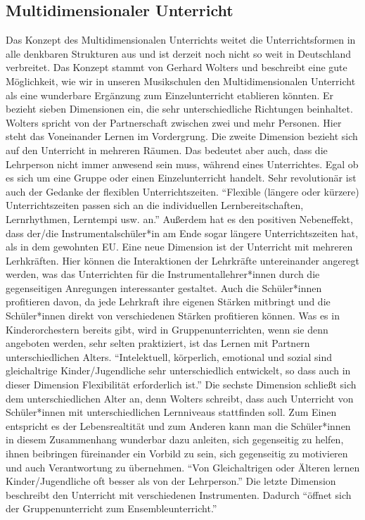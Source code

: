 \subsection{Multidimensionaler Unterricht} 
Das Konzept des Multidimensionalen Unterrichts weitet die Unterrichtsformen in
alle denkbaren Strukturen aus und ist derzeit noch nicht so weit in Deutschland
verbreitet. Das Konzept stammt von Gerhard Wolters und beschreibt eine gute
Möglichkeit, wie wir in unseren Musikschulen den Multidimensionalen Unterricht
als eine wunderbare Ergänzung zum Einzelunterricht etablieren könnten. Er
bezieht sieben Dimensionen ein, die sehr unterschiedliche Richtungen beinhaltet.
\autocite[86ff]{ernst:die_zukunftsfaehige_musikschule} Wolters spricht von der
Partnerschaft zwischen zwei und mehr Personen. Hier steht das Voneinander Lernen
im Vordergrung. Die zweite Dimension bezieht sich auf den Unterricht in mehreren
Räumen. Das bedeutet aber auch, dass die Lehrperson nicht immer anwesend sein
muss, während eines Unterrichtes. Egal ob es sich um eine Gruppe oder einen
Einzelunterricht handelt. Sehr revolutionär ist auch der Gedanke der flexiblen
Unterrichtszeiten. \enquote{Flexible (längere oder kürzere) Unterrichtszeiten
passen sich an die individuellen Lernbereitschaften, Lernrhythmen, Lerntempi
usw. an.} \autocite[87]{ernst:die_zukunftsfaehige_musikschule} Außerdem hat es
den positiven Nebeneffekt, dass der/die Instrumentalschüler*in am Ende sogar längere
Unterrichtszeiten hat, als in dem gewohnten EU. Eine neue Dimension ist der
Unterricht mit mehreren Lerhkräften. Hier können die Interaktionen der
Lehrkräfte untereinander angeregt werden, was das Unterrichten für die
Instrumentallehrer*innen durch die gegenseitigen Anregungen interessanter gestaltet.
Auch die Schüler*innen profitieren davon, da jede Lehrkraft ihre eigenen Stärken
mitbringt und die Schüler*innen direkt von verschiedenen Stärken profitieren können.
Was es in Kinderorchestern bereits gibt, wird in Gruppenunterrichten, wenn sie
denn angeboten werden, sehr selten praktiziert, ist das Lernen mit Partnern
unterschiedlichen Alters. \enquote{Intelektuell, körperlich, emotional und sozial sind
gleichaltrige Kinder/Jugendliche sehr unterschiedlich entwickelt, so dass auch
in dieser Dimension Flexibilität erforderlich ist.}
\autocite[87]{ernst:die_zukunftsfaehige_musikschule} Die sechste Dimension
schließt sich dem unterschiedlichen Alter an, denn Wolters schreibt, dass auch
Unterricht von Schüler*innen mit unterschiedlichen Lernniveaus stattfinden soll. Zum
Einen entspricht es der Lebensrealtität und zum Anderen kann man die Schüler*innen in
diesem Zusammenhang wunderbar dazu anleiten, sich gegenseitig zu helfen, ihnen
beibringen füreinander ein Vorbild zu sein, sich gegenseitig zu motivieren und
auch Verantwortung zu übernehmen. \enquote{Von Gleichaltrigen oder Älteren
lernen Kinder/Jugendliche oft besser als von der Lehrperson.}
\autocite[87]{ernst:die_zukunftsfaehige_musikschule} Die letzte Dimension
beschreibt den Unterricht mit verschiedenen Instrumenten. Dadurch
\enquote{öffnet sich der Gruppenunterricht zum Ensembleunterricht.}
\autocite[87]{ernst:die_zukunftsfaehige_musikschule}

